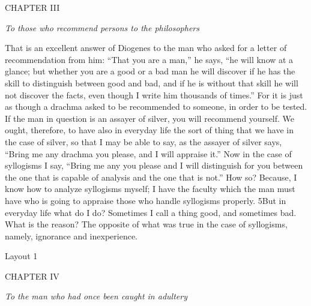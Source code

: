 CHAPTER III

\emph{To those who recommend persons to the philosophers}

That is an excellent answer of Diogenes to the man who asked for a letter of recommendation from him: ``That you are a man,'' he says, ``he will know at a glance; but whether you are a good or a bad man he will discover if he has the skill to distinguish between good and bad, and if he is without that skill he will not discover the facts, even though I write him thousands of times.'' For it is just as though a drachma asked to be recommended to someone, in order to be tested. If the man in question is an assayer of silver, you will recommend yourself. We ought, therefore, to have also in everyday life the sort of thing that we have in the case of silver, so that I may be able to say, as the assayer of silver says, ``Bring me any drachma you please, and I will appraise it.'' Now in the case of syllogisms I say, ``Bring me any you please and I will distinguish for you between the one that is capable of analysis and the one that is not.'' How so? Because, I know how to analyze syllogisms myself; I have the faculty which the man must have who is going to appraise those who handle syllogisms properly. 5But in everyday life what do I do? Sometimes I call a thing good, and sometimes bad. What is the reason? The opposite of what was true in the case of syllogisms, namely, ignorance and inexperience.



Layout 1

CHAPTER IV

\emph{To the man who had once been caught in adultery}

